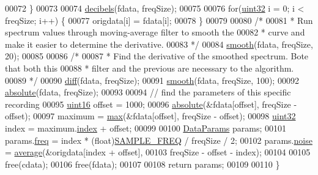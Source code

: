 \begin{DoxyCode}
00072         \}
00073 
00074         \hyperlink{namespaceavda_a9c0b7f832eace3cbc9c5dddea2ecc9d5}{decibels}(fdata, freqSize);
00075 
00076         \textcolor{keywordflow}{for}(\hyperlink{definitions_8hpp_a1134b580f8da4de94ca6b1de4d37975e}{uint32} i = 0; i < freqSize; i++) \{
00077             origdata[i] = fdata[i];
00078         \}
00079 
00080         \textcolor{comment}{/*}
00081 \textcolor{comment}{         * Run spectrum values through moving-average filter to smooth the}
00082 \textcolor{comment}{         * curve and make it easier to determine the derivative.}
00083 \textcolor{comment}{         */}
00084         \hyperlink{namespaceavda_a22583ba7f11b69c955b13155bf9a739d}{smooth}(fdata, freqSize, 20);
00085 
00086         \textcolor{comment}{/*}
00087 \textcolor{comment}{         * Find the derivative of the smoothed spectrum. Bote that both this}
00088 \textcolor{comment}{         * filter and the previous are necessary to the algorithm.}
00089 \textcolor{comment}{         */}
00090         \hyperlink{namespaceavda_a3e9b92cfa9d76c4c363e8ed8a4c1a2ce}{diff}(fdata, freqSize);
00091         \hyperlink{namespaceavda_a22583ba7f11b69c955b13155bf9a739d}{smooth}(fdata, freqSize, 100);
00092         \hyperlink{namespaceavda_aa771d0ed99fc4954c643ea71e91905bf}{absolute}(fdata, freqSize);
00093 
00094         \textcolor{comment}{// find the parameters of this specific recording}
00095         \hyperlink{definitions_8hpp_a05f6b0ae8f6a6e135b0e290c25fe0e4e}{uint16} offset = 1000;
00096         \hyperlink{namespaceavda_aa771d0ed99fc4954c643ea71e91905bf}{absolute}(&fdata[offset], freqSize - offset);
00097         maximum = \hyperlink{namespaceavda_aa82021c3ee552773c060b1a39caf8aaa}{max}(&fdata[offset], freqSize - offset);
00098         \hyperlink{definitions_8hpp_a1134b580f8da4de94ca6b1de4d37975e}{uint32} index = maximum.\hyperlink{structMaximum_a2e6aef03795cd285fe542d0861c6e3b5}{index} + offset;
00099         
00100         \hyperlink{structDataParams}{DataParams} params;
00101         params.\hyperlink{structDataParams_a12566e017407647bc8287d62554ad3fb}{freq} = index * (float)\hyperlink{definitions_8hpp_a8ace559345ecba7978591ac2ef22aea4}{SAMPLE\_FREQ} / freqSize / 2;
00102         params.\hyperlink{structDataParams_a4efd1d2231c6fa7c878c9d5e1650738f}{noise} = \hyperlink{namespaceavda_a2a830f24a59aa2538ea82f6e000cce61}{average}(&origdata[index + offset],
00103                 freqSize - offset - index);
00104 
00105         free(cdata);
00106         free(fdata);
00107 
00108         \textcolor{keywordflow}{return} params;
00109 
00110     \}
\end{DoxyCode}



